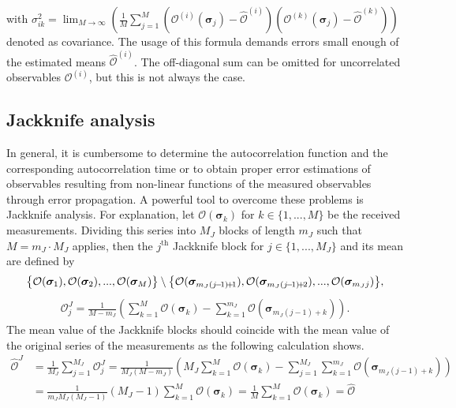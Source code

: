 with $\sigma^2_{ik}\!=\!\lim_{M\to\infty}(\frac{1}{M}\sum_{j=1}^M(\mathcal{O}^{(i)}\!(\bm{\sigma}_j)\!-\!\hat{\mathcal{O}}^{(i)})(\mathcal{O}^{(k)}\!(\bm{\sigma}_j)\!-\!\hat{\mathcal{O}}^{(k)}))$ denoted
as covariance. The usage of this formula demands errors small enough of the estimated means $\hat{\mathcal{O}}^{(i)}$. The off-diagonal sum can be omitted for uncorrelated observables $\mathcal{O}^{(i)}$,
but this is not always the case.~\cite[p.39]{Bevington2003}





\subsection*{Jackknife analysis}

In general, it is cumbersome to determine the autocorrelation function and the corresponding autocorrelation time or to obtain proper error estimations of 
observables resulting from non-linear functions of the measured observables through error propagation. A powerful tool to overcome these problems is 
Jackknife analysis. For explanation, let $\mathcal{O}(\bm{\sigma}_k)$ for $k\!\in\!\{1,...,M\}$ be the received measurements. Dividing this series into 
$M_J$ blocks of length $m_J$ such that $M\!=\!m_J\!\cdot\!M_J$ applies, then the $j^\text{th}$ Jackknife block for $j\!\in\!\{1,...,M_J\}$ and its mean 
are defined by 
\begin{align*}
    \big{\{}\mathcal{O}(\bm{\sigma}_1),\mathcal{O}(\bm{\sigma}_2),...,\mathcal{O}(\bm{\sigma}_M)\big{\}}
    \setminus
    \big{\{}\mathcal{O}(\bm{\sigma}_{m_J(j\!-\!1)\!+\!1}),\mathcal{O}(\bm{\sigma}_{m_J(j\!-\!1)\!+\!2}),...,\mathcal{O}(\bm{\sigma}_{m_Jj})\big{\}},
\end{align*}
\begin{align*}
    \mathcal{O}^J_j=\frac{1}{M\!-\!m_J}\left( \sum_{k=1}^M\mathcal{O}(\bm{\sigma}_k)-\sum_{k=1}^{m_J}\mathcal{O}(\bm{\sigma}_{m_J(j\!-\!1)\!+\!k}) \right).
\end{align*}
The mean value of the Jackknife blocks should coincide with the mean value of the original series of the measurements as the following calculation shows.
\begin{align*}
    \hat{\mathcal{O}}^J &= \frac{1}{M_J}\sum_{j=1}^{M_J}\mathcal{O}^J_j
                         = \frac{1}{M_J(M\!-\!m_J)}\left(M_J\sum_{k=1}^M\mathcal{O}(\bm{\sigma}_k) 
                           - \sum_{j=1}^{M_J}\sum_{k=1}^{m_J}\mathcal{O}(\bm{\sigma}_{m_J(j\!-\!1)\!+\!k}) \right) \\
                        &= \frac{1}{m_JM_J(M_J\!-\!1)}(M_J\!-\!1)\sum_{k=1}^M\mathcal{O}(\bm{\sigma}_k) 
                         = \frac{1}{M}\sum_{k=1}^M\mathcal{O}(\bm{\sigma}_k)
                         =\hat{\mathcal{O}}
\end{align*}
